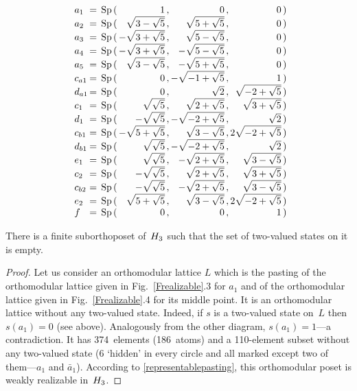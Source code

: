 \begin {figure}[p]
$$\begin {array}{l@{\,=\,\Sp\,(\,}r@{\,,\,}r@{\,,\,}r@{\,)}}
a_{ 1} & 1               & 0                & 0                \\
a_{ 2} & \sqrt{3-\sqrt5} & \sqrt{ 5+\sqrt5} & 0                \\
a_{ 3} &-\sqrt{3+\sqrt5} & \sqrt{ 5-\sqrt5} & 0                \\
a_{ 4} &-\sqrt{3+\sqrt5} &-\sqrt{ 5-\sqrt5} & 0                \\
a_{ 5} & \sqrt{3-\sqrt5} &-\sqrt{ 5+\sqrt5} & 0                \\
c_{a1} & 0               &-\sqrt{-1+\sqrt5} & 1                \\
d_{a1} & 0               & \sqrt 2          & \sqrt{-2+\sqrt5} \\
c_{ 1} & \sqrt{  \sqrt5} & \sqrt{ 2+\sqrt5} & \sqrt{ 3+\sqrt5} \\
d_{ 1} &-\sqrt{  \sqrt5} &-\sqrt{-2+\sqrt5} & \sqrt  2         \\
c_{b1} &-\sqrt{5+\sqrt5} & \sqrt{ 3-\sqrt5} &2\sqrt{-2+\sqrt5} \\
d_{b1} & \sqrt{  \sqrt5} &-\sqrt{-2+\sqrt5} & \sqrt  2         \\
e_{ 1} & \sqrt{  \sqrt5} &-\sqrt{ 2+\sqrt5} & \sqrt{ 3-\sqrt5} \\
c_{ 2} &-\sqrt{  \sqrt5} & \sqrt{ 2+\sqrt5} & \sqrt{ 3+\sqrt5} \\
c_{b2} &-\sqrt{  \sqrt5} &-\sqrt{ 2+\sqrt5} & \sqrt{ 3-\sqrt5} \\
e_{ 2} & \sqrt{5+\sqrt5} & \sqrt{ 3-\sqrt5} &2\sqrt{-2+\sqrt5} \\
f      & 0               & 0                & 1
\end {array}
$$
\end {figure}


\begin {proposition} \label {empty}
There is a finite suborthoposet of~$H_3$ such that the set of two-valued
states on it is empty.
\end {proposition}


\begin {proof}
Let us consider an orthomodular lattice $L$ which is the pasting of the
orthomodular lattice given in Fig.~\ref{Frealizable}.3 for $a_1$ and of the
orthomodular lattice given in Fig.~\ref{Frealizable}.4 for its middle point.
It is an orthomodular lattice without any two-valued state. Indeed, if $s$
is a two-valued state on~$L$ then $s(a_1)=0$ (see above). Analogously from
the other diagram, $s(a_1)=1$---a contradiction. It has 374~elements
(186~atoms) and a 110-element subset without any two-valued state (6
`hidden' in every circle and all marked except two of them---$a_1$ and $\bar
a_1$). According to \ref {representablepasting}, this orthomodular poset is
weakly realizable in~$H_3$.
\end {proof}


